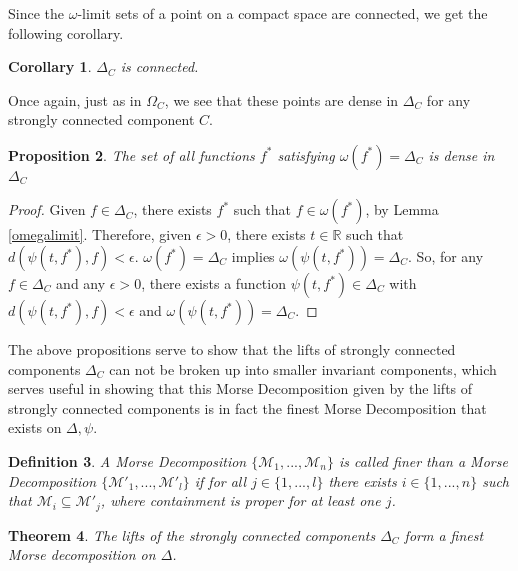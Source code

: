 \documentclass[11pt]{article}
\newtheorem{thm}{Theorem}
\newtheorem{defn}[thm]{Definition}
\newtheorem{prop}[thm]{Proposition}
\newtheorem{cor}[thm]{Corollary}
\begin{document}
Since the $\omega$-limit sets of a point on a compact space are connected, we get the following corollary.

\begin{cor}\label{connected}
$\Delta_C$ is connected.
\end{cor}

Once again, just as in $\Omega_C$, we see that these points are dense in $\Delta_C$ for any strongly connected component $C$.


\begin{prop}\label{dense}
The set of all functions $f^*$ satisfying $\omega(f^*) = \Delta_C$ is dense in $\Delta_C$
\end{prop}

\begin{proof}
Given $f \in \Delta_C$, there exists $f^*$ such that $f \in \omega(f^*)$, by Lemma \ref{omegalimit}.  Therefore, given $\epsilon > 0$, there exists $t \in \mathbb{R}$ such that $d(\psi(t,f^*),f) < \epsilon$.   $\omega(f^*) = \Delta_C$ implies $\omega(\psi(t,f^*)) = \Delta_C$. So, for any $f \in \Delta_C$ and any $\epsilon > 0$, there exists a function $\psi(t,f^*) \in \Delta_C$ with $d(\psi(t,f^*),f) < \epsilon$ and $\omega(\psi(t,f^*)) = \Delta_C$.
\end{proof}

The above propositions serve to show that the lifts of strongly connected components $\Delta_C$ can not be broken up into smaller invariant components, which serves useful in showing that this Morse Decomposition given by the lifts of strongly connected components is in fact the finest Morse Decomposition that exists on $\Delta,\psi$. 

\begin{defn}\label{finer}
A Morse Decomposition $\{\mathcal{M}_1,...,\mathcal{M}_n\}$ is called finer than a Morse Decomposition $\{\mathcal{M}'_1,...,\mathcal{M}'_l\}$ if for all $j \in \{1,...,l\}$ there exists $i \in \{1,...,n\}$ such that $\mathcal{M}_i \subseteq \mathcal{M}'_j$, where containment is proper for at least one $j$.
\end{defn}

\begin{thm}\label{finest}
The lifts of the strongly connected components $\Delta_C$ form a finest Morse decomposition on $\Delta$.
\end{thm}
\end{document}
